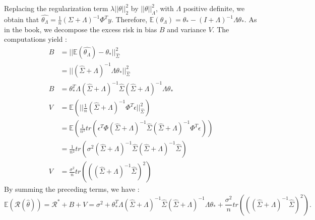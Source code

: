 \begin{questions}
\begin{solution}
    Replacing the regularization term $\lambda ||\theta||^2_2$ by $||\theta||^2_{\Lambda}$, with $\Lambda$ positive definite, we obtain that $\hat{\theta_{\Lambda}} = \frac{1}{n}(\Sigma+\Lambda)^{-1}\Phi^Ty$. Therefore, $\mathbb{E}(\theta_\Lambda) = \theta_* - (I+\Lambda)^{-1} \Lambda \theta_*$.
    As in the book, we decompose the excess risk in bias $B$ and variance $V$. The computations yield :
    $$
\begin{aligned}
B &= ||\mathbb{E}(\hat{\theta_{\Lambda}}) - \theta_*||^2_{\hat{\Sigma}} \\
&= ||(\hat{\Sigma}+\Lambda)^{-1} \Lambda \theta_*||^2_{\hat{\Sigma}} \\
B &= \theta_*^T \Lambda (\hat{\Sigma} + \Lambda)^{-1} \hat{\Sigma} (\hat{\Sigma} + \Lambda)^{-1} \Lambda \theta_* \\
V &= \mathbb{E}(||\frac{1}{n} (\hat{\Sigma}+\Lambda)^{-1}\Phi^T \epsilon||^2_{\hat{\Sigma}}) \\
&= \mathbb{E}(\frac{1}{n^2} tr(\epsilon^T \Phi (\hat{\Sigma} + \Lambda)^{-1} \hat{\Sigma} (\hat{\Sigma} + \Lambda)^{-1} \Phi^T  \epsilon)) \\
&=\frac{1}{n^2} tr(\sigma^2 (\hat{\Sigma} + \Lambda)^{-1} \hat{\Sigma} (\hat{\Sigma} + \Lambda)^{-1} \hat{\Sigma}) \\
V &= \frac{\sigma^2}{n} tr(((\hat{\Sigma} + \Lambda)^{-1} \hat{\Sigma})^2)
\end{aligned}$$
By summing the preceding terms, we have : $$\mathbb{E}(\mathcal{R}(\hat{\theta})) = \mathcal{R}^* + B + V = \sigma^2 + \theta_*^T \Lambda (\hat{\Sigma} + \Lambda)^{-1} \hat{\Sigma} (\hat{\Sigma} + \Lambda)^{-1} \Lambda \theta_* + \frac{\sigma^2}{n} tr(((\hat{\Sigma} + \Lambda)^{-1} \hat{\Sigma})^2).$$
\end{solution}
\end{questions}